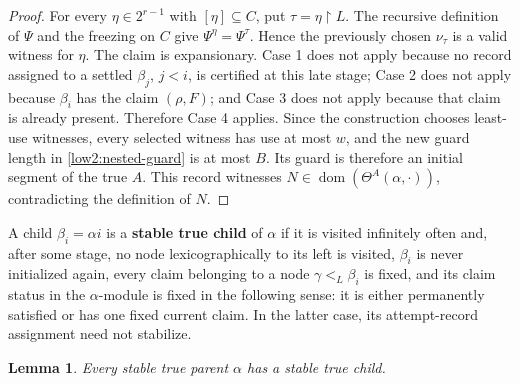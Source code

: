 \documentclass[11pt]{amsart}
\newtheorem{lemma}[theorem]{Lemma}
\begin{document}
\begin{proof}
For every $\eta\in2^{r-1}$ with
$[\eta]\subseteq C$, put $\tau=\eta\upharpoonright L$. The recursive
definition of $\Psi$ and the freezing on $C$ give $\Psi^\eta=\Psi^\tau$.
Hence the previously chosen $\nu_\tau$ is a valid witness for $\eta$. The
claim is expansionary. Case 1 does not apply because no record assigned to a
settled $\beta_j$, $j<i$, is certified at this late stage; Case 2 does not
apply because $\beta_i$ has the claim $(\rho,F)$; and Case 3 does not apply
because that claim is already present. Therefore Case 4 applies. Since the
construction chooses least-use witnesses, every selected witness has use at
most $w$, and the new
guard length in \eqref{low2:nested-guard} is at most $B$. Its guard is
therefore an initial segment of the true $A$. This record witnesses $ N\in\operatorname{dom}(\Theta^A(\alpha,\cdot))$,
contradicting the definition of $N$.
\end{proof}

A child $\beta_i=\alpha i$ is a \textbf{stable true child} of $\alpha$ if it
is visited infinitely often and, after some stage, no node lexicographically
to its left is visited, $\beta_i$ is never initialized again, every claim
belonging to a node $\gamma<_L\beta_i$ is fixed, and its claim status in the
$\alpha$-module is fixed in the following sense: it is either permanently
satisfied or has one fixed current claim. In the latter case, its
attempt-record assignment need not stabilize.

\begin{lemma}\label{low2:true-child}
Every stable true parent $\alpha$ has a stable true child.
\end{lemma}
\end{document}
